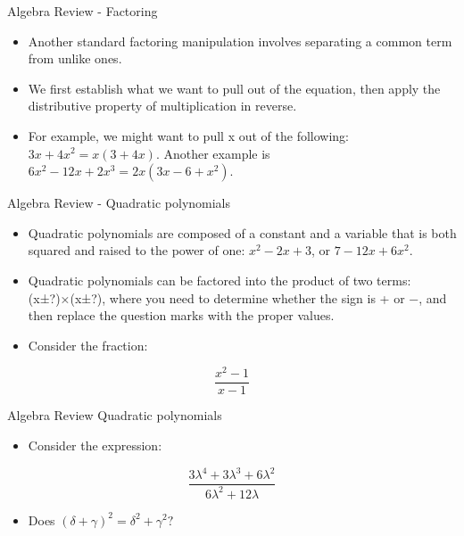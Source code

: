 \documentclass[
  ignorenonframetext,
]{beamer}
\providecommand{\tightlist}{%
  \setlength{\itemsep}{0pt}\setlength{\parskip}{0pt}}
\begin{document}
\begin{frame}{Algebra Review - Factoring}
\protect\hypertarget{algebra-review---factoring-1}{}

\begin{itemize}
\item
  Another standard factoring manipulation involves separating a common
  term from unlike ones.
\item
  We first establish what we want to pull out of the equation, then
  apply the distributive property of multiplication in reverse.
\item
  For example, we might want to pull x out of the following:
  \(3x + 4x^{2} = x(3 + 4x)\). Another example is
  \(6x^{2} − 12x+2x^3 =2x(3x−6+x^{2})\).
\end{itemize}

\end{frame}

\begin{frame}{Algebra Review - Quadratic polynomials}
\protect\hypertarget{algebra-review---quadratic-polynomials}{}

\begin{itemize}
\item
  Quadratic polynomials are composed of a constant and a variable that
  is both squared and raised to the power of one: \(x^2 − 2x + 3\), or
  \(7 − 12x + 6x^2\).
\item
  Quadratic polynomials can be factored into the product of two terms:
  (x±?)×(x±?), where you need to determine whether the sign is + or −,
  and then replace the question marks with the proper values.
\item
  Consider the fraction:
\end{itemize}

\[\frac{x^2-1}{x-1}\]

\end{frame}

\begin{frame}{Algebra Review Quadratic polynomials}
\protect\hypertarget{algebra-review-quadratic-polynomials}{}

\begin{itemize}
\tightlist
\item
  Consider the expression:
\end{itemize}

\[\frac{3\lambda^4 + 3\lambda^3 + 6\lambda^2}{6\lambda^2 + 12\lambda}\]

\begin{itemize}
\tightlist
\item
  Does \((δ + γ)^{2} = δ^{2} + γ^{2}?\)
\end{itemize}

\end{frame}
\end{document}
